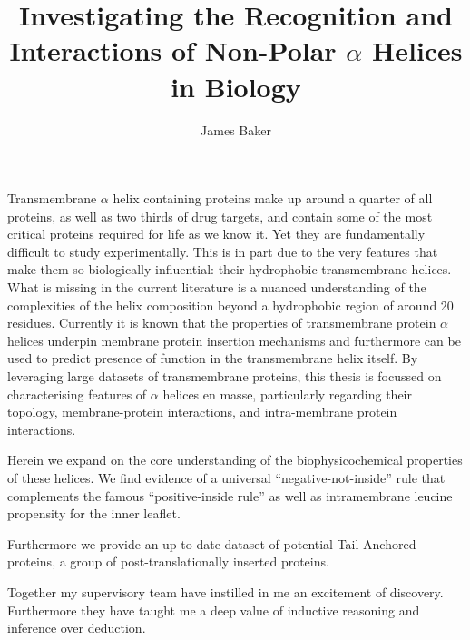 \documentclass[12pt,PhD,twoside]{muthesis}
\begin{document}
\title{Investigating the Recognition and Interactions of Non-Polar $\alpha$ Helices in Biology}
\author{James Baker}
\def\wordcount{xxxxx}

\tablespagefalse

\figurespagefalse


\beforeabstract %
Transmembrane $\alpha$ helix containing proteins make up around a quarter of all proteins, as well as two thirds of drug targets, and contain some of the most critical proteins required for life as we know it. Yet they are fundamentally difficult to study experimentally. This is in part due to the very features that make them so biologically influential: their hydrophobic transmembrane helices. What is missing in the current literature is a nuanced understanding of the complexities of the helix composition beyond a hydrophobic region of around 20 residues. Currently it is known that the properties of transmembrane protein $\alpha$ helices underpin membrane protein insertion mechanisms and furthermore can be used to predict presence of function in the transmembrane helix itself. By leveraging large datasets of transmembrane proteins, this thesis is focussed on characterising features of $\alpha$ helices en masse, particularly regarding their topology, membrane-protein interactions, and intra-membrane protein interactions.

Herein we expand on the core understanding of the biophysicochemical properties of these helices. We find evidence of a universal ``negative-not-inside'' rule that complements the famous ``positive-inside rule'' as well as intramembrane leucine propensity for the inner leaflet.

Furthermore we provide an up-to-date dataset of potential Tail-Anchored proteins, a group of post-translationally inserted proteins.
\afterabstract


Together my supervisory team have instilled in me an excitement of discovery. Furthermore they have taught me a deep value of inductive reasoning and inference over deduction.
\end{document}
